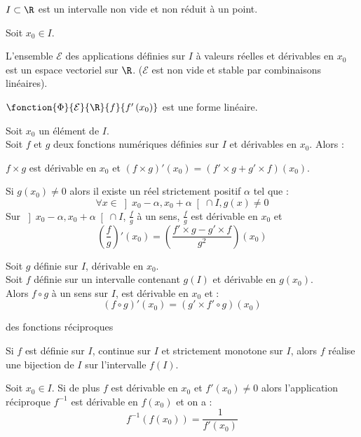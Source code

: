 \documentclass[12pt,twoside,a4paper]{article}
\author{MPSI 2}
\begin{document}
	\maketitle
	\begin{flushleft}
		$I\subset\R$ est un intervalle non vide et non r\'eduit \`a un point.
	\end{flushleft}
	\begin{prop}
		Soit $x_0\in I$.
		\begin{liste}
			\item L'ensemble $\mathcal{E}$ des applications d\'efinies sur $I$ \`a valeurs r\'eelles et d\'erivables en $x_0$ est un espace vectoriel sur $\R$. ($\mathcal{E}$ est non vide et stable par combinaisons linéaires).
			\item $\fonction{\Phi}{\mathcal{E}}{\R}{f}{f'\left(x_0\right)}$ est une forme lin\'eaire.
		\end{liste}
	\end{prop}
	\begin{prop}
		Soit $x_0$ un \'el\'ement de $I$. \\
		Soit $f$ et $g$ deux fonctions num\'eriques d\'efinies sur $I$ et d\'erivables en $x_0$. Alors :
		\begin{liste}
			\item $f\times g$ est d\'erivable en $x_0$ et $\left(f\times g\right)'\left(x_0\right)=\left(f'\times g+g'\times f\right)\left(x_0\right)$.
			\item Si $g\left(x_0\right)\neq 0$ alors il existe un r\'eel strictement positif $\alpha$ tel que :
				$$
					\forall x\in\left]x_0-\alpha,x_0+\alpha\right[\cap I,g\left(x\right)\neq 0
				$$
				Sur $\left]x_0-\alpha,x_0+\alpha\right[\cap I$, $\frac{f}{g}$ \`a un sens, $\frac{f}{g}$ est d\'erivable en $x_0$ et
				$$
					\left(\frac{f}{g}\right)'\left(x_0\right)=\left(\frac{f'\times g-g'\times f}{g^2}\right)\left(x_0\right)
				$$
		\end{liste}
	\end{prop}
	\begin{prop}
		Soit $g$ d\'efinie sur $I$, d\'erivable en $x_0$. \\
		Soit $f$ d\'efinie sur un intervalle contenant $g\left(I\right)$ et d\'erivable en $g\left(x_0\right)$. \\
		Alors $f\circ g$ \`a un sens sur $I$, est d\'erivable en $x_0$ et :
		$$
			\left(f\circ g\right)'\left(x_0\right)=\left(g'\times f'\circ g\right)\left(x_0\right)
		$$
	\end{prop}
	\newpage
	\begin{theo}{des fonctions r\'eciproques}
		\begin{liste}
			\item Si $f$ est d\'efinie sur $I$, continue sur $I$ et strictement monotone sur $I$, alors $f$ r\'ealise une bijection de $I$ sur l'intervalle $f\left(I\right)$.
			\item Soit $x_0\in I$. Si de plus $f$ est d\'erivable en $x_0$ et $f'\left(x_0\right)\neq 0$ alors l'application r\'eciproque $f^{-1}$ est d\'erivable en $f\left(x_0\right)$ et on a :
			$$
				f^{-1}\left(f\left(x_0\right)\right)=\frac{1}{f'\left(x_0\right)}
			$$
		\end{liste}
	\end{theo}
\end{document}

